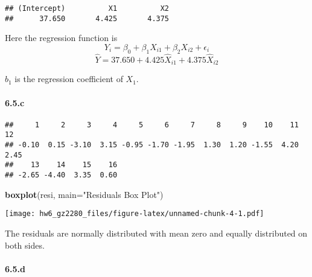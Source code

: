 \documentclass[]{article}
\newenvironment{Shaded}{\begin{snugshade}}{\end{snugshade}}
\newcommand{\DataTypeTok}[1]{\textcolor[rgb]{0.13,0.29,0.53}{#1}}
\newcommand{\KeywordTok}[1]{\textcolor[rgb]{0.13,0.29,0.53}{\textbf{#1}}}
\newcommand{\NormalTok}[1]{#1}
\newcommand{\OperatorTok}[1]{\textcolor[rgb]{0.81,0.36,0.00}{\textbf{#1}}}
\newcommand{\StringTok}[1]{\textcolor[rgb]{0.31,0.60,0.02}{#1}}
\let\oldparagraph\paragraph
\renewcommand{\paragraph}[1]{\oldparagraph{#1}\mbox{}}
\begin{document}
\begin{Shaded}
\end{Shaded}

\begin{verbatim}
## (Intercept)          X1          X2 
##      37.650       4.425       4.375
\end{verbatim}

Here the regression function is
\[Y_i=\beta_0+\beta_1 X_{i1} +\beta_2 X_{i2} + \epsilon_i\]
\[\hat Y=37.650+4.425 \hat X_{i1} +4.375 \hat X_{i2}\]

\(b_1\) is the regression coefficient of \(X_1\).

\hypertarget{c}{%
\paragraph{6.5.c}\label{c}}

\begin{Shaded}
\end{Shaded}

\begin{verbatim}
##     1     2     3     4     5     6     7     8     9    10    11    12 
## -0.10  0.15 -3.10  3.15 -0.95 -1.70 -1.95  1.30  1.20 -1.55  4.20  2.45 
##    13    14    15    16 
## -2.65 -4.40  3.35  0.60
\end{verbatim}

\begin{Shaded}
\begin{Highlighting}[]
\KeywordTok{boxplot}\NormalTok{(resi, }\DataTypeTok{main=}\StringTok{"Residuals Box Plot"}\NormalTok{)}
\end{Highlighting}
\end{Shaded}

\texttt{[image: hw6\_gz2280\_files/figure-latex/unnamed-chunk-4-1.pdf]}

The residuals are normally distributed with mean zero and equally
distributed on both sides.

\hypertarget{d}{%
\paragraph{6.5.d}\label{d}}
\end{document}
